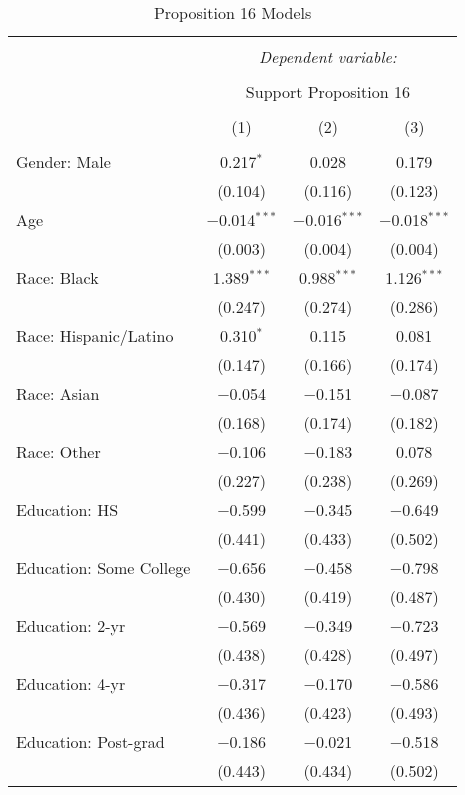 
\begin{table}[!htbp] \centering 
  \caption{Proposition 16 Models} 
  \label{tab:reg_prop16_long} 
\footnotesize 
\begin{tabular}{@{\extracolsep{5pt}}lccc} 
\\[-1.8ex]\hline 
\hline \\[-1.8ex] 
 & \multicolumn{3}{c}{\textit{Dependent variable:}} \\ 
\cline{2-4} 
\\[-1.8ex] & \multicolumn{3}{c}{Support Proposition 16} \\ 
\\[-1.8ex] & (1) & (2) & (3)\\ 
\hline \\[-1.8ex] 
 Gender: Male & 0.217$^{*}$ & 0.028 & 0.179 \\ 
  & (0.104) & (0.116) & (0.123) \\ 
  Age & $-$0.014$^{***}$ & $-$0.016$^{***}$ & $-$0.018$^{***}$ \\ 
  & (0.003) & (0.004) & (0.004) \\ 
  Race: Black & 1.389$^{***}$ & 0.988$^{***}$ & 1.126$^{***}$ \\ 
  & (0.247) & (0.274) & (0.286) \\ 
  Race: Hispanic/Latino & 0.310$^{*}$ & 0.115 & 0.081 \\ 
  & (0.147) & (0.166) & (0.174) \\ 
  Race: Asian & $-$0.054 & $-$0.151 & $-$0.087 \\ 
  & (0.168) & (0.174) & (0.182) \\ 
  Race: Other & $-$0.106 & $-$0.183 & 0.078 \\ 
  & (0.227) & (0.238) & (0.269) \\ 
  Education: HS & $-$0.599 & $-$0.345 & $-$0.649 \\ 
  & (0.441) & (0.433) & (0.502) \\ 
  Education: Some College & $-$0.656 & $-$0.458 & $-$0.798 \\ 
  & (0.430) & (0.419) & (0.487) \\ 
  Education: 2-yr & $-$0.569 & $-$0.349 & $-$0.723 \\ 
  & (0.438) & (0.428) & (0.497) \\ 
  Education: 4-yr & $-$0.317 & $-$0.170 & $-$0.586 \\ 
  & (0.436) & (0.423) & (0.493) \\ 
  Education: Post-grad & $-$0.186 & $-$0.021 & $-$0.518 \\ 
  & (0.443) & (0.434) & (0.502) \\ 

\end{tabular}
\end{table}
